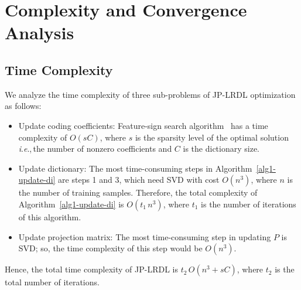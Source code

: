 \documentclass[journal]{IEEEtran}
\newcommand{\ie}{\textit{i}.\textit{e}.,\,}
\begin{document}
\section{Complexity and Convergence Analysis}
\label{sec:comp}
\subsection{Time Complexity}
We analyze the time complexity of three sub-problems of JP-LRDL optimization as follows:
\begin{itemize}
\item Update coding coefficients: Feature-sign search algorithm~\cite{Feature-Sign} has a time complexity of $O(sC)$, where $s$ is the sparsity level of the optimal solution \ie the number of nonzero coefficients and $C$ is the dictionary size.
\item Update dictionary: The most time-consuming steps in Algorithm~\ref{alg1-update-di} are steps 1 and 3, which need SVD with cost $O(n^3)$, where $n$ is the number of training samples. Therefore, the total complexity of Algorithm~\ref{alg1-update-di} is $O(t_1 \, n^3)$, where $t_1$ is the number of iterations of this algorithm.
\item Update projection matrix: The most time-consuming step in updating $P$ is SVD; so, the time complexity of this step would be $O(n^3)$.
\end{itemize}
Hence, the total time complexity of JP-LRDL is $t_2 \, O(n^3+sC)$, where $t_2$ is the total number of iterations. 
\end{document}

